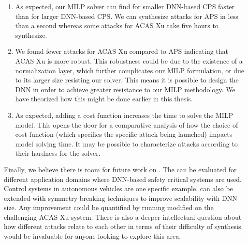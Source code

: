 \begin{enumerate}
\item As expected, our MILP solver can find \attack for smaller DNN-based CPS faster than for larger DNN-based CPS. We can synthesize attacks for APS in less than a second whereas some attacks for ACAS Xu take five hours to synthesize.%

\item We found fewer attacks for ACAS Xu compared to APS indicating that ACAS Xu is more robust. This robustness could be due to the existence of a normalization layer, which further complicates our MILP formulation, or due to its larger size resisting our solver. This means it is possible to design the DNN in order to achieve greater resistance to our MILP methodology. We have theorized how this might be done earlier in this thesis. %

\item As expected, adding a cost function increases the time to solve the MILP model. This opens the door for a comparative analysis of how the choice of cost function (which specifies the specific attack being launched) impacts model solving time. It may be possible to characterize attacks according to their hardness for the solver.
\end{enumerate}

Finally, we believe there is room for future work on \tool.
The \tool can be evaluated for different application domains where DNN-based safety critical systems are used.
Control systems in autonomous vehicles are one specific example.
\tool can also be extended with symmetry breaking techniques to improve scalability with DNN size.
Any improvement could be quantified by running modified \tool on the challenging ACAS Xu system.
There is also a deeper intellectual question about how different attacks relate to each other in terms of their difficulty of synthesis.
\tool would be invaluable for anyone looking to explore this area.

